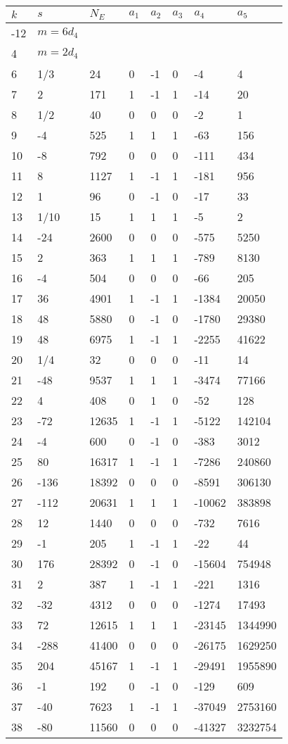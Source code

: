 \documentclass{amsart}
\begin{document}
\begin{longtable}{|l|l|l|lllll|}
\hline
$k$ & $s$ & $N_E$ & $a_1$ & $a_2$ & $a_3$ & $a_4$ & $a_5$\\
\hline
-12&$m=6d_{4}$&&\multicolumn{5}{c|}{}\\
4&$m=2d_{4}$&&\multicolumn{5}{c|}{}\\
6&1/3&24&0&-1&0&-4&4\\
7&2&171&1&-1&1&-14&20\\
8&1/2&40&0&0&0&-2&1\\
9&-4&525&1&1&1&-63&156\\
10&-8&792&0&0&0&-111&434\\
11&8&1127&1&-1&1&-181&956\\
12&1&96&0&-1&0&-17&33\\
13&1/10&15&1&1&1&-5&2\\
14&-24&2600&0&0&0&-575&5250\\
15&2&363&1&1&1&-789&8130\\
16&-4&504&0&0&0&-66&205\\
17&36&4901&1&-1&1&-1384&20050\\
18&48&5880&0&-1&0&-1780&29380\\
19&48&6975&1&-1&1&-2255&41622\\
20&1/4&32&0&0&0&-11&14\\
21&-48&9537&1&1&1&-3474&77166\\
22&4&408&0&1&0&-52&128\\
23&-72&12635&1&-1&1&-5122&142104\\
24&-4&600&0&-1&0&-383&3012\\
25&80&16317&1&-1&1&-7286&240860\\
26&-136&18392&0&0&0&-8591&306130\\
27&-112&20631&1&1&1&-10062&383898\\
28&12&1440&0&0&0&-732&7616\\
29&-1&205&1&-1&1&-22&44\\
30&176&28392&0&-1&0&-15604&754948\\
31&2&387&1&-1&1&-221&1316\\
32&-32&4312&0&0&0&-1274&17493\\
33&72&12615&1&1&1&-23145&1344990\\
34&-288&41400&0&0&0&-26175&1629250\\
35&204&45167&1&-1&1&-29491&1955890\\
36&-1&192&0&-1&0&-129&609\\
37&-40&7623&1&-1&1&-37049&2753160\\
38&-80&11560&0&0&0&-41327&3232754\\

\end{longtable}
\end{document}
